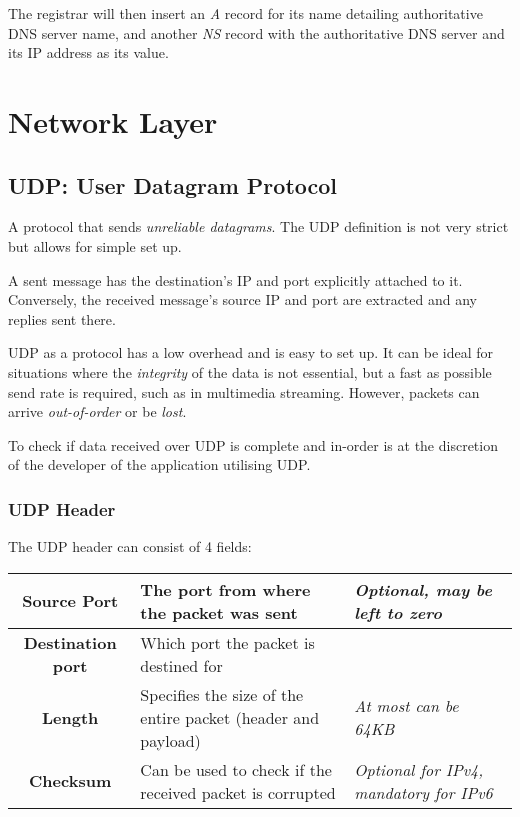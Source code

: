 \documentclass{article}
\begin{document}
The registrar will then insert an \textit{A} record for its name detailing authoritative DNS server name, and another \textit{NS} record with the authoritative DNS server and its IP address as its value.

\newpage
\section{Network Layer}

\subsection{UDP: User Datagram Protocol}

A protocol that sends \textit{unreliable datagrams}. The UDP definition is not very strict but allows for simple set up.

A sent message has the destination's IP and port explicitly attached to it. Conversely, the received message's source IP and port are extracted and any replies sent there.

UDP as a protocol has a low overhead and is easy to set up. It can be ideal for situations where the \textit{integrity} of the data is not essential, but a fast as possible send rate is required, such as in multimedia streaming. However, packets can arrive \textit{out-of-order} or be \textit{lost}.

To check if data received over UDP is complete and in-order is at the discretion of the developer of the application utilising UDP.

\subsubsection{UDP Header}

The UDP header can consist of 4 fields:

\begin{center}
  \begin{tabular}{|c|p{4cm}|p{3.5cm}|}
    \hline
    \textbf{Source Port} & The port from where the packet was sent & \textit{Optional, may be left to zero}\\
    \hline
    \textbf{Destination port} & Which port the packet is destined for & \\
    \hline
    \textbf{Length} & Specifies the size of the entire packet (header and payload) & \textit{At most can be 64KB}\\
    \hline
    \textbf{Checksum} & Can be used to check if the received packet is corrupted & \textit{Optional for IPv4, mandatory for IPv6}\\
    \hline
  \end{tabular}
\end{center}
\end{document}
